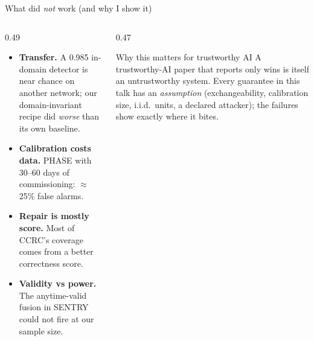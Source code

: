 \documentclass[aspectratio=169,10pt]{beamer}
\begin{document}
\begin{frame}{What did \emph{not} work (and why I show it)}
\begin{columns}[T]
\begin{column}{0.49\textwidth}
{\footnotesize
\begin{itemize}\setlength\itemsep{3pt}
\item \textbf{Transfer.} A 0.985 in-domain detector is near chance on another network; our domain-invariant recipe did \emph{worse} than its own baseline.
\item \textbf{Calibration costs data.} PHASE with 30--60 days of commissioning: \(\approx\)25\% false alarms.
\item \textbf{Repair is mostly score.} Most of CCRC's coverage comes from a better correctness score.
\item \textbf{Validity vs power.} The anytime-valid fusion in SENTRY could not fire at our sample size.
\end{itemize}}
\end{column}
\begin{column}{0.47\textwidth}
\begin{block}{Why this matters for trustworthy AI}
{\footnotesize A trustworthy-AI paper that reports only wins is itself an untrustworthy system. Every guarantee in this talk has an \emph{assumption} (exchangeability, calibration size, i.i.d.\ units, a declared attacker); the failures show exactly where it bites.}
\end{block}
\end{column}
\end{columns}
\end{frame}
\end{document}

